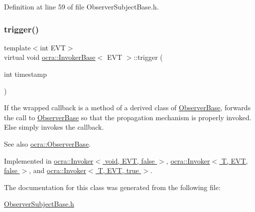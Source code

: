 Definition at line 59 of file Observer\+Subject\+Base.\+h.

\hypertarget{classocra_1_1InvokerBase_ae4d7537a1b2c0aa9b5188c5da8423289}{}\label{classocra_1_1InvokerBase_ae4d7537a1b2c0aa9b5188c5da8423289} 
\subsubsection{\texorpdfstring{trigger()}{trigger()}}
{\footnotesize\ttfamily template$<$int E\+VT$>$ \\
virtual void \hyperlink{classocra_1_1InvokerBase}{ocra\+::\+Invoker\+Base}$<$ E\+VT $>$\+::trigger (\begin{DoxyParamCaption}\item[{int}]{timestamp }\end{DoxyParamCaption})\hspace{0.3cm}{\ttfamily [pure virtual]}}

If the wrapped callback is a method of a derived class of \hyperlink{classocra_1_1ObserverBase}{Observer\+Base}, forwards the call to \hyperlink{classocra_1_1ObserverBase}{Observer\+Base} so that the propagation mechanism is properly invoked. Else simply invokes the callback. \begin{DoxySeeAlso}{See also}
\hyperlink{classocra_1_1ObserverBase}{ocra\+::\+Observer\+Base}. 
\end{DoxySeeAlso}


Implemented in \hyperlink{classocra_1_1Invoker_3_01void_00_01EVT_00_01false_01_4_a483d45eb6e668e5c97b9861840f4d6ea}{ocra\+::\+Invoker$<$ void, E\+V\+T, false $>$}, \hyperlink{classocra_1_1Invoker_3_01T_00_01EVT_00_01false_01_4_a740261f9f9c3278c9668d192eae56c2a}{ocra\+::\+Invoker$<$ T, E\+V\+T, false $>$}, and \hyperlink{classocra_1_1Invoker_3_01T_00_01EVT_00_01true_01_4_a9b6283c07e6477a21c4b82b17940d832}{ocra\+::\+Invoker$<$ T, E\+V\+T, true $>$}.



The documentation for this class was generated from the following file\+:\begin{DoxyCompactItemize}
\item 
\hyperlink{ObserverSubjectBase_8h}{Observer\+Subject\+Base.\+h}\end{DoxyCompactItemize}
